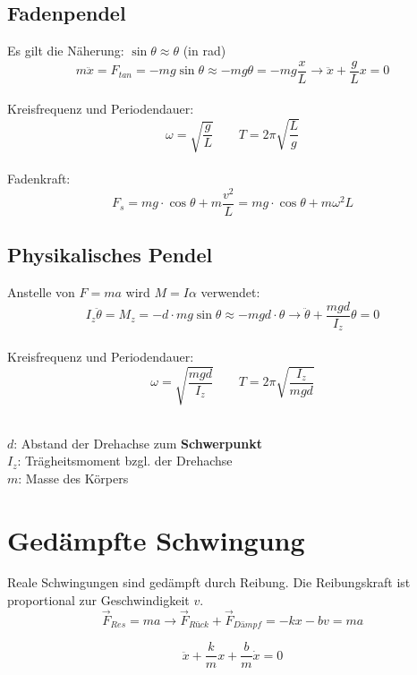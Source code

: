 \subsection{Fadenpendel}

Es gilt die Näherung: $\sin \theta \approx \theta$ (in rad)
\[
	m\ddot{x} = F_{tan} = -mg\sin\theta \approx -mg\theta = -mg\frac{x}{L} \rightarrow \ddot{x} + \frac{g}{L}x = 0
\]
\\
Kreisfrequenz und Periodendauer:
\[\boxed{
	\omega = \sqrt{\frac{g}{L}} \qquad T = 2\pi \sqrt{\frac{L}{g}}
}\]
\\
Fadenkraft:
\[
	F_s = mg\cdot \cos\theta + m\frac{v^2}{L} = mg\cdot \cos\theta + m\omega^2 L
\]


\subsection{Physikalisches Pendel}
Anstelle von $F=ma$ wird $M=I\alpha$ verwendet:
\[
	I_z \ddot{\theta} = M_z = -d \cdot mg\sin\theta \approx -mgd\cdot \theta \rightarrow \ddot{\theta} + \frac{mgd}{I_z} \theta = 0
\]
\\
Kreisfrequenz und Periodendauer:
\[\boxed{
	\omega = \sqrt{\frac{mgd}{I_z}} \qquad T = 2\pi \sqrt{\frac{I_z}{mgd}}
}\]
\\
\begin{footnotesize}
	$d$: Abstand der Drehachse zum \textbf{Schwerpunkt}\\
	$I_z$: Trägheitsmoment bzgl. der Drehachse\\
	$m$: Masse des Körpers
\end{footnotesize}


\section{Gedämpfte Schwingung}
Reale Schwingungen sind gedämpft durch Reibung. Die Reibungskraft ist proportional zur Geschwindigkeit $v$.
\[
	\vec{F}_{Res} = ma \rightarrow \vec{F}_{Rück} + \vec{F}_{Dämpf} = -kx -bv = ma
\]

\[\boxed{
	\ddot{x} + \frac{k}{m} x + \frac{b}{m} \dot{x} = 0
}\]

